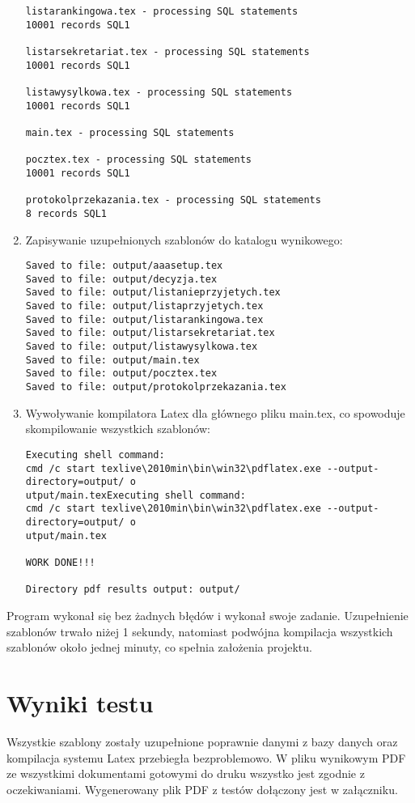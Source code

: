 \begin{enumerate}
\begin{verbatim}
listarankingowa.tex - processing SQL statements
10001 records SQL1

listarsekretariat.tex - processing SQL statements
10001 records SQL1

listawysylkowa.tex - processing SQL statements
10001 records SQL1

main.tex - processing SQL statements

pocztex.tex - processing SQL statements
10001 records SQL1

protokolprzekazania.tex - processing SQL statements
8 records SQL1

 \end{verbatim}
 
   \item Zapisywanie uzupełnionych szablonów do katalogu wynikowego:
 \begin{verbatim}
Saved to file: output/aaasetup.tex
Saved to file: output/decyzja.tex
Saved to file: output/listanieprzyjetych.tex
Saved to file: output/listaprzyjetych.tex
Saved to file: output/listarankingowa.tex
Saved to file: output/listarsekretariat.tex
Saved to file: output/listawysylkowa.tex
Saved to file: output/main.tex
Saved to file: output/pocztex.tex
Saved to file: output/protokolprzekazania.tex

 \end{verbatim}
 
   \item Wywoływanie kompilatora Latex dla głównego pliku main.tex, co spowoduje skompilowanie wszystkich szablonów:
 \begin{verbatim}
Executing shell command:
cmd /c start texlive\2010min\bin\win32\pdflatex.exe --output-directory=output/ o
utput/main.texExecuting shell command:
cmd /c start texlive\2010min\bin\win32\pdflatex.exe --output-directory=output/ o
utput/main.tex

WORK DONE!!!

Directory pdf results output: output/
 \end{verbatim}
\end{enumerate}
Program wykonał się bez żadnych błędów i wykonał swoje zadanie. Uzupełnienie szablonów trwało niżej 1 sekundy, natomiast podwójna kompilacja wszystkich szablonów około jednej minuty, co spełnia założenia projektu. 

\section{Wyniki testu}

Wszystkie szablony zostały uzupełnione poprawnie danymi z bazy danych oraz kompilacja systemu Latex przebiegła bezproblemowo. W pliku wynikowym PDF ze wszystkimi dokumentami gotowymi do druku wszystko jest zgodnie z oczekiwaniami. Wygenerowany plik PDF z testów  dołączony jest w załączniku.


